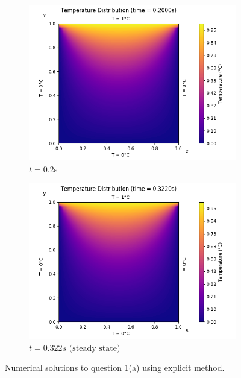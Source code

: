 \documentclass[a4paper]{article}
\begin{document}
\begin{figure}[H]
			\medskip
			\begin{subfigure}{0.48\textwidth}
				\includegraphics[width=\linewidth]{figures/1a_explicit/5)t=200ms.png}
				\caption{$t = 0.2$s}
			\end{subfigure}\hspace*{\fill}
			\begin{subfigure}{0.48\textwidth}
				\includegraphics[width=\linewidth]{figures/1a_explicit/6)t=322ms(ss).png}
				\caption{$t = 0.322s \text{ (steady state)}$}
				\label{solution_1a_explicit_ss}
			\end{subfigure}
			
			\caption{Numerical solutions to question 1(a) using explicit method.} \label{solution_1a_explicit}
		\end{figure}
		
\end{document}
